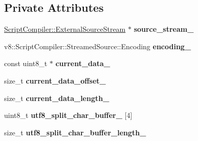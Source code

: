 \subsection*{Private Attributes}
\begin{DoxyCompactItemize}
\item 
\hyperlink{classv8_1_1_script_compiler_1_1_external_source_stream}{Script\+Compiler\+::\+External\+Source\+Stream} $\ast$ {\bfseries source\+\_\+stream\+\_\+}\hypertarget{classv8_1_1internal_1_1_external_streaming_stream_a10d3f25ab3c905380f0d250f9484d7a6}{}\label{classv8_1_1internal_1_1_external_streaming_stream_a10d3f25ab3c905380f0d250f9484d7a6}

\item 
v8\+::\+Script\+Compiler\+::\+Streamed\+Source\+::\+Encoding {\bfseries encoding\+\_\+}\hypertarget{classv8_1_1internal_1_1_external_streaming_stream_a49b4856073010306a4498e3a799609b2}{}\label{classv8_1_1internal_1_1_external_streaming_stream_a49b4856073010306a4498e3a799609b2}

\item 
const uint8\+\_\+t $\ast$ {\bfseries current\+\_\+data\+\_\+}\hypertarget{classv8_1_1internal_1_1_external_streaming_stream_a140ef27f297e9bd7f70b71e944f823a4}{}\label{classv8_1_1internal_1_1_external_streaming_stream_a140ef27f297e9bd7f70b71e944f823a4}

\item 
size\+\_\+t {\bfseries current\+\_\+data\+\_\+offset\+\_\+}\hypertarget{classv8_1_1internal_1_1_external_streaming_stream_a43af73c382f0e5c226ff6a881121e9b2}{}\label{classv8_1_1internal_1_1_external_streaming_stream_a43af73c382f0e5c226ff6a881121e9b2}

\item 
size\+\_\+t {\bfseries current\+\_\+data\+\_\+length\+\_\+}\hypertarget{classv8_1_1internal_1_1_external_streaming_stream_acf96eef227c3e7c47cc23e57f57f68c5}{}\label{classv8_1_1internal_1_1_external_streaming_stream_acf96eef227c3e7c47cc23e57f57f68c5}

\item 
uint8\+\_\+t {\bfseries utf8\+\_\+split\+\_\+char\+\_\+buffer\+\_\+} \mbox{[}4\mbox{]}\hypertarget{classv8_1_1internal_1_1_external_streaming_stream_a0e62fa45a2092c655c1390dad5b52363}{}\label{classv8_1_1internal_1_1_external_streaming_stream_a0e62fa45a2092c655c1390dad5b52363}

\item 
size\+\_\+t {\bfseries utf8\+\_\+split\+\_\+char\+\_\+buffer\+\_\+length\+\_\+}\hypertarget{classv8_1_1internal_1_1_external_streaming_stream_a2c3c6c18fb249e986e37827adda77070}{}\label{classv8_1_1internal_1_1_external_streaming_stream_a2c3c6c18fb249e986e37827adda77070}


\end{DoxyCompactItemize}
